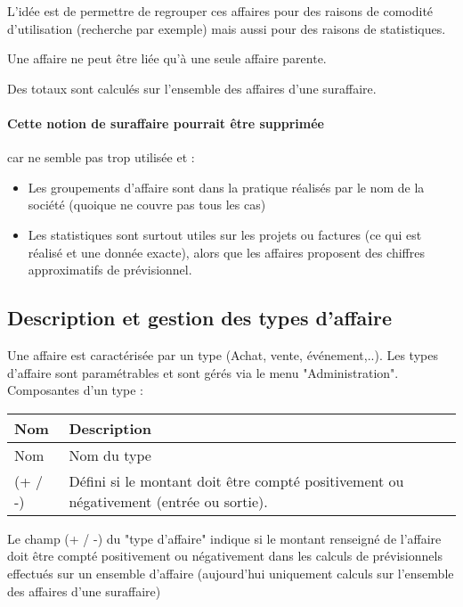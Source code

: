 L'idée est de permettre de regrouper ces affaires pour des raisons de comodité d'utilisation (recherche par exemple) mais aussi pour des raisons de statistiques.


Une affaire ne peut être liée qu'à une seule affaire parente.

Des totaux sont calculés sur l'ensemble des affaires d'une suraffaire.

\paragraph{Cette notion de suraffaire pourrait être supprimée} car ne semble pas trop utilisée et :

\begin{itemize}
\item Les groupements d'affaire sont dans la pratique réalisés par le nom de la société (quoique ne couvre pas tous les cas)
\item Les statistiques sont surtout utiles sur les projets ou factures (ce qui est réalisé et une donnée exacte), alors que les affaires proposent des chiffres approximatifs de prévisionnel.
\end{itemize}


\subsection{Description et gestion des types d'affaire}
\label{deal_type}

Une affaire est caractérisée par un type (Achat, vente, événement,..).
Les types d'affaire sont paramétrables et sont gérés via le menu "Administration".\\

Composantes d'un type :\\

\begin{tabular}{|p{3cm}|p{10cm}|}
\hline
\textbf{Nom} & \textbf{Description} \\
\hline
Nom & Nom du type \\
\hline
(+ / -) & Défini si le montant doit être compté positivement ou négativement (entrée ou sortie).\\
\hline
\end{tabular}
\vspace{0.3cm}

Le champ (+ / -) du "type d'affaire" indique si le montant renseigné de l'affaire doit être compté positivement ou négativement dans les calculs de prévisionnels effectués sur un ensemble d'affaire (aujourd'hui uniquement calculs sur l'ensemble des affaires d'une suraffaire)

